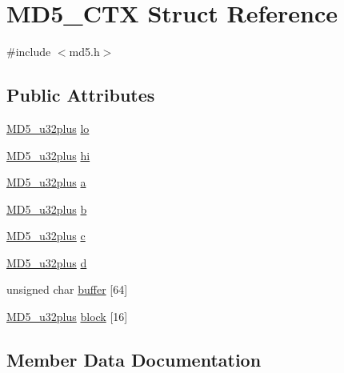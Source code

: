 \hypertarget{structMD5__CTX}{}\section{M\+D5\+\_\+\+C\+TX Struct Reference}
\label{structMD5__CTX}


{\ttfamily \#include $<$md5.\+h$>$}

\subsection*{Public Attributes}
\begin{DoxyCompactItemize}
\item 
\hyperlink{md5_8h_ad854d8865ff7e0ce3717676b84926f54}{M\+D5\+\_\+u32plus} \hyperlink{structMD5__CTX_a90437ec62a8dda787f1667061d9755fe}{lo}
\item 
\hyperlink{md5_8h_ad854d8865ff7e0ce3717676b84926f54}{M\+D5\+\_\+u32plus} \hyperlink{structMD5__CTX_a3234f683810977ac629c2a8a05a1cc87}{hi}
\item 
\hyperlink{md5_8h_ad854d8865ff7e0ce3717676b84926f54}{M\+D5\+\_\+u32plus} \hyperlink{structMD5__CTX_abfbd731eb0b9d13a75ee4e49715e30b5}{a}
\item 
\hyperlink{md5_8h_ad854d8865ff7e0ce3717676b84926f54}{M\+D5\+\_\+u32plus} \hyperlink{structMD5__CTX_a63ef5819a909e0b4065796dfdac25962}{b}
\item 
\hyperlink{md5_8h_ad854d8865ff7e0ce3717676b84926f54}{M\+D5\+\_\+u32plus} \hyperlink{structMD5__CTX_a6226440d9b52200d32153df206fe3761}{c}
\item 
\hyperlink{md5_8h_ad854d8865ff7e0ce3717676b84926f54}{M\+D5\+\_\+u32plus} \hyperlink{structMD5__CTX_a3b2316dbfcad4bdb1306dc441761f396}{d}
\item 
unsigned char \hyperlink{structMD5__CTX_a2da73ecf544745f58211e998719f367f}{buffer} \mbox{[}64\mbox{]}
\item 
\hyperlink{md5_8h_ad854d8865ff7e0ce3717676b84926f54}{M\+D5\+\_\+u32plus} \hyperlink{structMD5__CTX_a2db62677a153981a205d225b051f0609}{block} \mbox{[}16\mbox{]}
\end{DoxyCompactItemize}


\subsection{Member Data Documentation}
\hypertarget{structMD5__CTX_abfbd731eb0b9d13a75ee4e49715e30b5}{}\label{structMD5__CTX_abfbd731eb0b9d13a75ee4e49715e30b5} 
